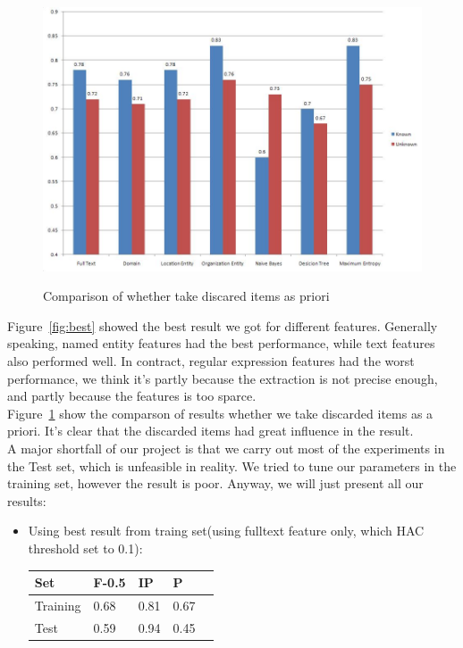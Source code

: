 \documentclass{article}
\begin{document}
\begin{CJK}{UTF8}{gbsn}
    \begin{figure}
    \caption{Comparison of whether take discared items as priori}
    \includegraphics[width=120mm]{discard}
    \label{fig:discard}
    \end{figure}

    Figure~\ref{fig:best} showed the best result we got for different features.  
    Generally speaking, named entity features had the best performance, while text features also performed well. 
    In contract, regular expression features had the worst performance, we think it's partly because the extraction is not precise enough, and partly because the features is too sparce. \\

    Figure~\ref{fig:discard} show the comparson of results whether we take discarded items as a priori. It's clear that the discarded items had great influence in the result. \\

    A major shortfall of our project is that we carry out most of the experiments in the Test set, which is unfeasible in reality. 
    We tried to tune our parameters in the training set, however the result is poor. Anyway, we will just present all our results:

    \begin{itemize}
    \item Using best result from traing set(using fulltext feature only, which HAC threshold set to 0.1): \\
    \begin{tabular}{|l|l|l|l|l|}
    \hline
    \textbf{Set} & \textbf{F-0.5} & \textbf{IP} & \textbf{P} \\
    \hline
    Training &  0.68 & 0.81 & 0.67 \\
    \hline
    Test&  0.59 & 0.94 & 0.45 \\
    \hline
    \end{tabular}


\end{itemize}
\end{CJK}
\end{document}

